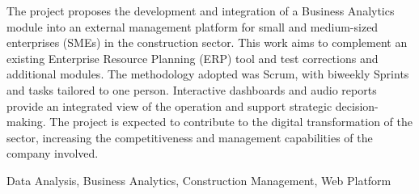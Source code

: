 
The project proposes the development and integration of a Business Analytics module into an external management platform for small and medium-sized enterprises (SMEs) in the construction sector. This work aims to complement an existing Enterprise Resource Planning (ERP) tool and test corrections and additional modules. The methodology adopted was Scrum, with biweekly Sprints and tasks tailored to one person. Interactive dashboards and audio reports provide an integrated view of the operation and support strategic decision-making. The project is expected to contribute to the digital transformation of the sector, increasing the competitiveness and management capabilities of the company involved.

\mbox{}\linebreak
{} Data Analysis, Business Analytics, Construction Management, Web Platform

